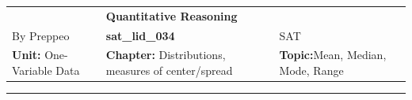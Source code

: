 \documentclass[11pt,paper=a4,answers]{exam}
\begin{document}
\begin{center}
    \centering
    \renewcommand{\arraystretch}{1.5}
    \begin{tabularx}{\textwidth}{YYY}
    & \normalsize\bf{{\Large{{Quantitative Reasoning}}}} & \\
    By Preppeo & \normalsize\bf{{sat\_lid\_034}} & SAT\\
    \normalsize{{\textbf{{Unit:}} One-Variable Data}} & \normalsize{{\textbf{{Chapter:}} Distributions, measures of center/spread}} & \normalsize{{\textbf{{Topic:}}Mean, Median, Mode, Range}} \\
    \end{tabularx}
\end{center}
\par\noindent\rule{\textwidth}{1pt}
\end{document}
